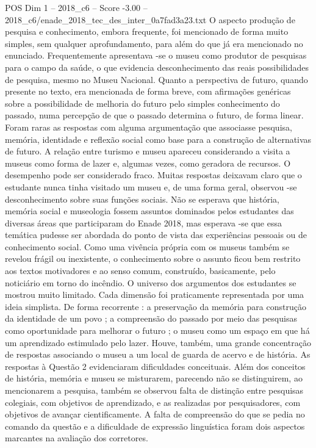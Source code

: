\begin{textsample}{POS Dim 1 – 2018\_c6 – Score -3.00 – 2018\_c6/enade\_2018\_tec\_des\_inter\_0a7fad3a23.txt}
O aspecto produção de pesquisa e conhecimento, embora frequente, foi mencionado de forma muito simples, sem qualquer aprofundamento, para além do que já era mencionado no enunciado.
Frequentemente apresentava -se o museu como produtor de pesquisas para o campo da saúde, o que evidencia desconhecimento das reais possibilidades de pesquisa, mesmo no Museu Nacional.
Quanto a perspectiva de futuro, quando presente no texto, era mencionada de forma breve, com afirmações genéricas sobre a possibilidade de melhoria do futuro pelo simples conhecimento do passado, numa percepção de que o passado determina o futuro, de forma linear.
Foram raras as respostas com alguma argumentação que associasse pesquisa, memória, identidade e reflexão social como base para a construção de alternativas de futuro.
A relação entre turismo e museu apareceu considerando a visita a museus como forma de lazer e, algumas vezes, como geradora de recursos.
O desempenho pode ser considerado fraco.
Muitas respostas deixavam claro que o estudante nunca tinha visitado um museu e, de uma forma geral, observou -se desconhecimento sobre suas funções sociais.
Não se esperava que história, memória social e museologia fossem assuntos dominados pelos estudantes das diversas áreas que participaram do Enade 2018, mas esperava -se que essa temática pudesse ser abordada do ponto de vista das experiências pessoais ou de conhecimento social.
Como uma vivência própria com os museus também se revelou frágil ou inexistente, o conhecimento sobre o assunto ficou bem restrito aos textos motivadores e ao senso comum, construído, basicamente, pelo noticiário em torno do incêndio.
O universo dos argumentos dos estudantes se mostrou muito limitado.
Cada dimensão foi praticamente representada por uma ideia simplista.
De forma recorrente : a preservação da memória para construção da identidade de um povo ; a compreensão do passado por meio das pesquisas como oportunidade para melhorar o futuro ; o museu como um espaço em que há um aprendizado estimulado pelo lazer.
Houve, também, uma grande concentração de respostas associando o museu a um local de guarda de acervo e de história.
As respostas à Questão 2 evidenciaram dificuldades conceituais.
Além dos conceitos de história, memória e museu se misturarem, parecendo não se distinguirem, ao mencionarem a pesquisa, também se observou falta de distinção entre pesquisas colegiais, com objetivos de aprendizado, e as realizadas por pesquisadores, com objetivos de avançar cientificamente.
A falta de compreensão do que se pedia no comando da questão e a dificuldade de expressão linguística foram dois aspectos marcantes na avaliação dos corretores.

\end{textsample}
